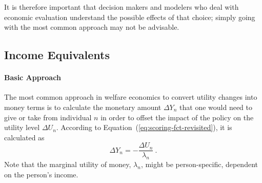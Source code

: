 %
It is therefore important that decision makers and modelers who deal with economic evaluation understand the possible effects of that choice; simply going with the most common approach may not be advisable.
%

\subsection{Income Equivalents}%
\label{ch:economicEval:aggregatingValues:income}%
%
\paragraph*{Basic Approach}
%
The most common approach in welfare economics to convert utility changes into money terms is to calculate the monetary amount $\Delta Y_n$ that one would need to give or take from individual $n$ in order to offset the impact of the policy on the utility level $\Delta U_n$.
%
According to Equation~(\ref{eq:scoring-fct-revisited}), it is calculated as 
\begin{equation}
\Delta Y_n = - \frac{\Delta U_n}{\lambda_n} \ .
\label{eq:ch:economicEval:monetizationWtP}
\end{equation}
%
%
Note that the marginal utility of money, $\lambda_n$, might be person-specific, \eg dependent on the person's income.

